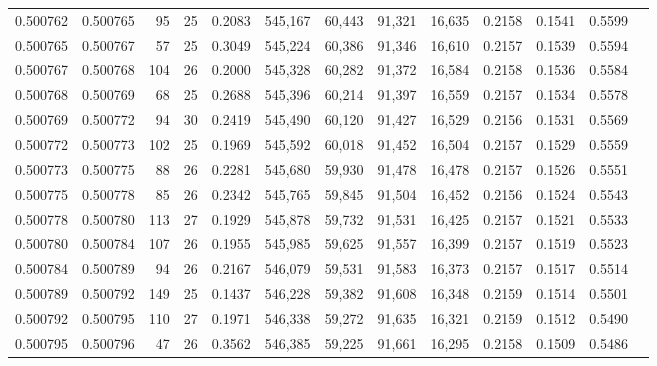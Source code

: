 \begin{tabular}{rrrrrrrrrrrrr}
0.500762 & 0.500765 &  95 &  25 &                                     0.2083 & 545,167 &  60,443 &  91,321 &  16,635 & 0.2158 & 0.1541 & 0.5599 \\
0.500765 & 0.500767 &  57 &  25 &                                     0.3049 & 545,224 &  60,386 &  91,346 &  16,610 & 0.2157 & 0.1539 & 0.5594 \\
0.500767 & 0.500768 & 104 &  26 &                                     0.2000 & 545,328 &  60,282 &  91,372 &  16,584 & 0.2158 & 0.1536 & 0.5584 \\
0.500768 & 0.500769 &  68 &  25 &                                     0.2688 & 545,396 &  60,214 &  91,397 &  16,559 & 0.2157 & 0.1534 & 0.5578 \\
0.500769 & 0.500772 &  94 &  30 &                                     0.2419 & 545,490 &  60,120 &  91,427 &  16,529 & 0.2156 & 0.1531 & 0.5569 \\
0.500772 & 0.500773 & 102 &  25 &                                     0.1969 & 545,592 &  60,018 &  91,452 &  16,504 & 0.2157 & 0.1529 & 0.5559 \\
0.500773 & 0.500775 &  88 &  26 &                                     0.2281 & 545,680 &  59,930 &  91,478 &  16,478 & 0.2157 & 0.1526 & 0.5551 \\
0.500775 & 0.500778 &  85 &  26 &                                     0.2342 & 545,765 &  59,845 &  91,504 &  16,452 & 0.2156 & 0.1524 & 0.5543 \\
0.500778 & 0.500780 & 113 &  27 &                                     0.1929 & 545,878 &  59,732 &  91,531 &  16,425 & 0.2157 & 0.1521 & 0.5533 \\
0.500780 & 0.500784 & 107 &  26 &                                     0.1955 & 545,985 &  59,625 &  91,557 &  16,399 & 0.2157 & 0.1519 & 0.5523 \\
0.500784 & 0.500789 &  94 &  26 &                                     0.2167 & 546,079 &  59,531 &  91,583 &  16,373 & 0.2157 & 0.1517 & 0.5514 \\
0.500789 & 0.500792 & 149 &  25 &                                     0.1437 & 546,228 &  59,382 &  91,608 &  16,348 & 0.2159 & 0.1514 & 0.5501 \\
0.500792 & 0.500795 & 110 &  27 &                                     0.1971 & 546,338 &  59,272 &  91,635 &  16,321 & 0.2159 & 0.1512 & 0.5490 \\
0.500795 & 0.500796 &  47 &  26 &                                     0.3562 & 546,385 &  59,225 &  91,661 &  16,295 & 0.2158 & 0.1509 & 0.5486 \\

\end{tabular}

